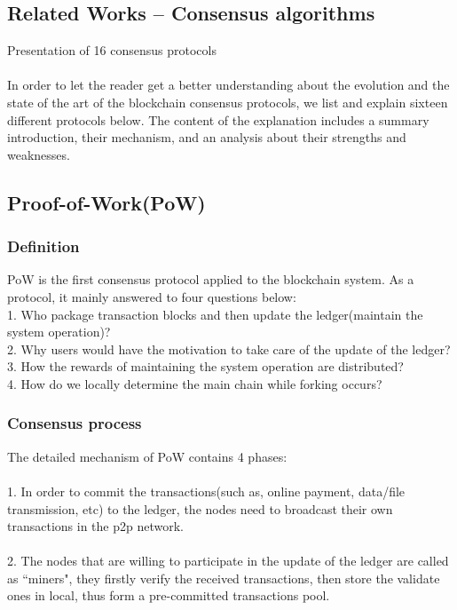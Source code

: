 \documentclass[doublespacing]{bmcart}
\begin{document}
\begin{CJK*}{UTF8}{gbsn}
\section{Related Works – Consensus algorithms}
Presentation of 16 consensus protocols
\paragraph{}
	In order to let the reader get a better understanding about the evolution and the state of the art of the blockchain consensus protocols, we list and explain sixteen different protocols below. The content of the explanation includes a summary introduction, their mechanism, and an analysis about their strengths and weaknesses.

	\subsection{Proof-of-Work(PoW)}
    \subsubsection*{Definition}
     PoW is the first consensus protocol applied to the blockchain system. As a protocol, it mainly answered to four questions below: 
    \\1. Who package transaction blocks and then update the ledger(maintain the system operation)?
    \\2. Why users would have the motivation to take care of the update of the ledger?
    \\3. How the rewards of maintaining the system operation are distributed?
    \\4. How do we locally determine the main chain while forking occurs?
    \subsubsection*{Consensus process}
    The detailed mechanism of PoW contains 4 phases:
	\paragraph{}    
    1. In order to commit the transactions(such as, online payment, data/file transmission, etc) to the ledger, the nodes need to broadcast their own transactions in the p2p network.
    \paragraph{}
    2. The nodes that are willing to participate in the update of the ledger are called as ``miners", they firstly verify the received transactions, then store the validate ones in local, thus form a pre-committed transactions pool.

\end{CJK*}
\end{document}
